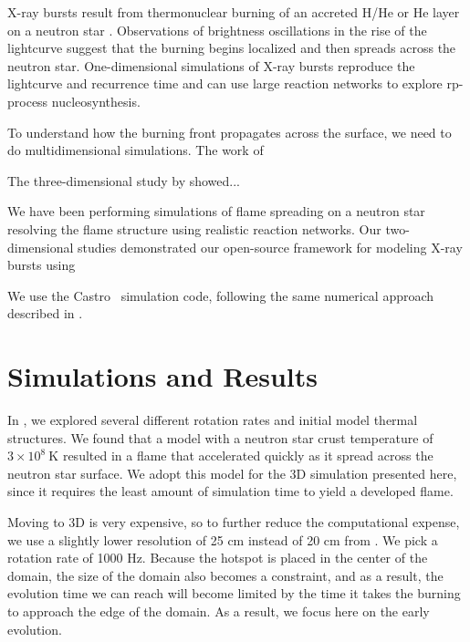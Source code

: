 \documentclass[preprint,times,tighten]{aastex631}
\newcommand{\castro}{{\sf Castro}}
\begin{document}
X-ray bursts result from thermonuclear burning of an accreted H/He or
He layer on a neutron star \citep{galloway:2017}.  Observations of
brightness oscillations in the rise of the lightcurve suggest that the
burning begins localized and then spreads across the neutron star.
One-dimensional simulations of X-ray bursts reproduce the lightcurve
and recurrence time \citep{woosley-xrb} and can use large reaction
networks to explore rp-process nucleosynthesis.

To understand how the burning front propagates across the surface, we
need to do multidimensional simulations.  The work of
\citet{cavecchi:2013,art-2015-cavecchi-etal,art-2016-cavecchi-etal}

The three-dimensional study by \citet{Cavecchi2019} showed...

We have been performing simulations of flame spreading on a neutron
star resolving the flame structure using realistic reaction networks.  Our two-dimensional studies \citep{eiden:2020,harpole:2021} demonstrated our open-source framework for modeling X-ray bursts using 

We use the \castro\ \citep{castro,castro_joss} simulation code, following
the same numerical approach described in \citet{eiden:2020,harpole:2021}.

\section{Simulations and Results}\label{Sec:results}

In \citet{harpole:2021}, we explored several different rotation rates
and initial model thermal structures.  We found that a model with a
neutron star crust temperature of $3\times 10^8~\mathrm{K}$ resulted
in a flame that accelerated quickly as it spread across the neutron
star surface.  We adopt this model for the 3D simulation presented
here, since it requires the least amount of simulation time to yield a
developed flame.  


Moving to 3D is very expensive, so to further reduce the computational
expense, we use a slightly lower resolution of 25 cm instead of 20 cm
from \citet{harpole:2021}.  We pick a rotation rate of 1000 Hz.
Because the hotspot is placed in the center of the domain, the size of
the domain also becomes a constraint, and as a result, the evolution
time we can reach will become limited by the time it takes the burning
to approach the edge of the domain.  As a result, we focus here on the
early evolution.
\end{document}
